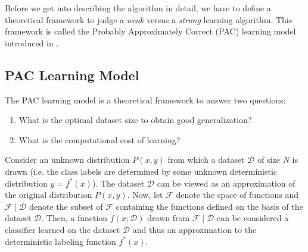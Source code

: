 \documentclass[11pt]{article}
\begin{document}
Before we get into describing the algorithm in detail, we have to define a theoretical framework to judge
a \textit{weak} versus a \textit{strong} learning algorithm. This framework is called the Probably
Approximately Correct (PAC) learning model introduced in \cite{valiant1984theory}.

\subsection{PAC Learning Model}
The PAC learning model is a theoretical framework to answer two questions:
\begin{enumerate}
    \item What is the optimal dataset size to obtain good generalization?
    \item What is the computational cost of learning?
\end{enumerate}

Consider an unknown distribution $P(x, y)$ from which a dataset $\mathcal{D}$ of size $N$ is
drawn (i.e. the class labels are determined by some unknown deterministic distribution
$y = f^* (x)$). The dataset $\mathcal{D}$ can be viewed as an approximation of the original
distribution $P(x, y)$. Now, let $\mathcal{F}$ denote the space of functions and
$\mathcal{F} \mid \mathcal{D}$ denote the subset of $\mathcal{F}$ containing the functions
defined on the basis of the dataset $\mathcal{D}$. Then, a function $f(x ; \mathcal{D})$ drawn
from $\mathcal{F} \mid \mathcal{D}$ can be considered a classifier learned on the dataset
$\mathcal{D}$ and thus an approximation to the deterministic labeling function $f^* (x)$.

\end{document}
